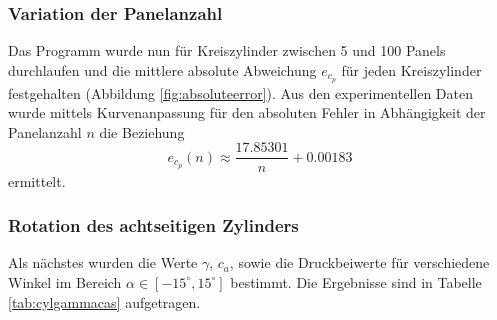\subsubsection{Variation der Panelanzahl}
Das Programm wurde nun für Kreiszylinder zwischen 5 und 100 Panels durchlaufen und die mittlere absolute Abweichung $e_{c_p}$ für jeden Kreiszylinder festgehalten (Abbildung \ref{fig:absoluteerror}). Aus den experimentellen Daten wurde mittels Kurvenanpassung für den absoluten Fehler in Abhängigkeit der Panelanzahl $n$ die Beziehung 
\begin{equation}
e_{c_{p}}(n) \approx \frac{17.85301}{n} + 0.00183
\end{equation}
ermittelt.

\subsubsection{Rotation des achtseitigen Zylinders}
Als nächstes wurden die Werte $\gamma$, $c_a$, sowie die Druckbeiwerte für verschiedene Winkel im Bereich $\alpha \in [-15^{\circ}, 15^{\circ}]$ bestimmt. Die Ergebnisse sind in Tabelle \ref{tab:cylgammacas} aufgetragen. 

